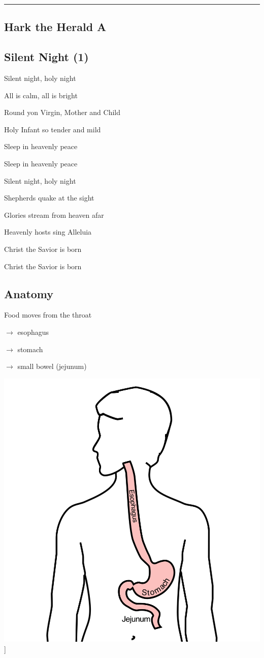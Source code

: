\documentclass[
  letterpaper,
  DIV=11,
  numbers=noendperiod]{scrartcl}
\begin{document}
\begin{center}\rule{0.5\linewidth}{0.5pt}\end{center}

\subsection{Hark the Herald A}\label{hark-the-herald-a}

\subsection{Silent Night (1)}\label{silent-night-1}

Silent night, holy night

All is calm, all is bright

Round yon Virgin, Mother and Child

Holy Infant so tender and mild

Sleep in heavenly peace

Sleep in heavenly peace

Silent night, holy night

Shepherds quake at the sight

Glories stream from heaven afar

Heavenly hosts sing Alleluia

Christ the Savior is born

Christ the Savior is born

\subsection{Anatomy}\label{anatomy}

Food moves from the throat

\(\rightarrow\) esophagus

\(\rightarrow\) stomach

\(\rightarrow\) small bowel (jejunum)

\includegraphics{christmas2004_files/mediabag/Eso_Anatomy_Labels.png}{]}
\end{document}
